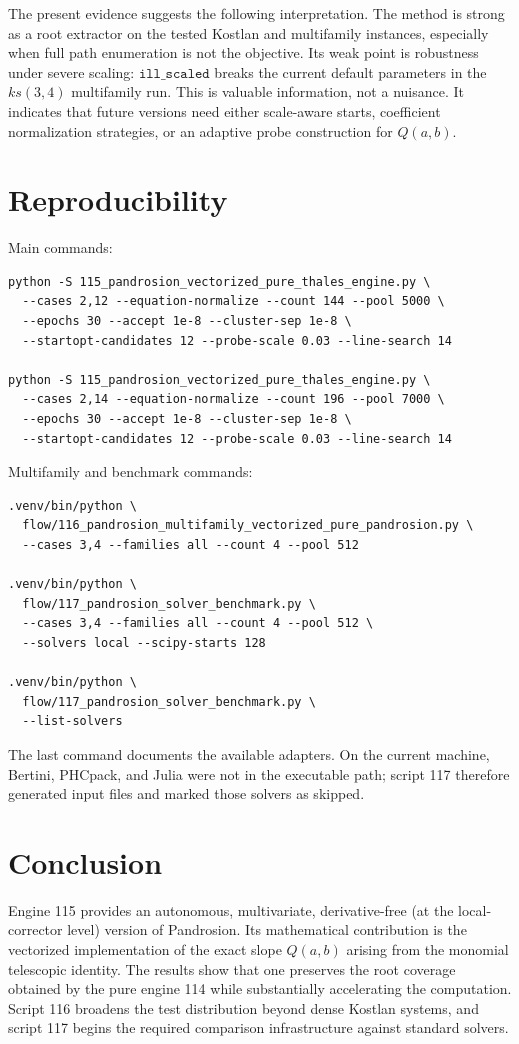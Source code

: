 \documentclass[11pt,a4paper]{article}
\begin{document}
The present evidence suggests the following interpretation. The method is strong as a root extractor on the tested Kostlan and multifamily instances, especially when full path enumeration is not the objective. Its weak point is robustness under severe scaling: \(\texttt{ill\_scaled}\) breaks the current default parameters in the \(ks(3,4)\) multifamily run. This is valuable information, not a nuisance. It indicates that future versions need either scale-aware starts, coefficient normalization strategies, or an adaptive probe construction for \(Q(a,b)\).

\section{Reproducibility}
Main commands:
\begin{verbatim}
python -S 115_pandrosion_vectorized_pure_thales_engine.py \
  --cases 2,12 --equation-normalize --count 144 --pool 5000 \
  --epochs 30 --accept 1e-8 --cluster-sep 1e-8 \
  --startopt-candidates 12 --probe-scale 0.03 --line-search 14

python -S 115_pandrosion_vectorized_pure_thales_engine.py \
  --cases 2,14 --equation-normalize --count 196 --pool 7000 \
  --epochs 30 --accept 1e-8 --cluster-sep 1e-8 \
  --startopt-candidates 12 --probe-scale 0.03 --line-search 14
\end{verbatim}

Multifamily and benchmark commands:
\begin{verbatim}
.venv/bin/python \
  flow/116_pandrosion_multifamily_vectorized_pure_pandrosion.py \
  --cases 3,4 --families all --count 4 --pool 512

.venv/bin/python \
  flow/117_pandrosion_solver_benchmark.py \
  --cases 3,4 --families all --count 4 --pool 512 \
  --solvers local --scipy-starts 128

.venv/bin/python \
  flow/117_pandrosion_solver_benchmark.py \
  --list-solvers
\end{verbatim}
The last command documents the available adapters. On the current machine, Bertini, PHCpack, and Julia were not in the executable path; script 117 therefore generated input files and marked those solvers as skipped.

\section{Conclusion}
Engine 115 provides an autonomous, multivariate, derivative-free (at the local-corrector level) version of Pandrosion. Its mathematical contribution is the vectorized implementation of the exact slope \(Q(a,b)\) arising from the monomial telescopic identity. The results show that one preserves the root coverage obtained by the pure engine 114 while substantially accelerating the computation. Script 116 broadens the test distribution beyond dense Kostlan systems, and script 117 begins the required comparison infrastructure against standard solvers.
\end{document}
